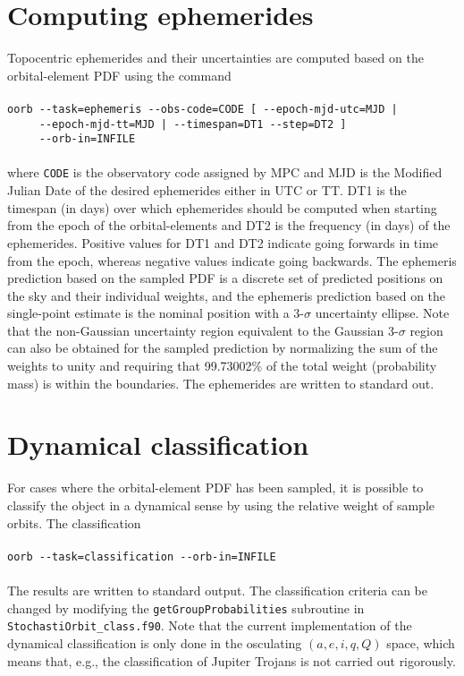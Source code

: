 \documentclass[12pt,english,twoside,a4paper]{report}
\begin{document}
\section{Computing ephemerides}

Topocentric ephemerides and their uncertainties are computed based on
the orbital-element PDF using the command \\ \\
\verb+oorb --task=ephemeris --obs-code=CODE [ --epoch-mjd-utc=MJD |+\\
\verb+     --epoch-mjd-tt=MJD | --timespan=DT1 --step=DT2 ]+\\
\verb+     --orb-in=INFILE+\\ \\
where \verb|CODE| is the observatory code assigned by MPC and MJD is
the Modified Julian Date of the desired ephemerides either in UTC or
TT. DT1 is the timespan (in days) over which ephemerides should be
computed when starting from the epoch of the orbital-elements and DT2
is the frequency (in days) of the ephemerides. Positive values for DT1
and DT2 indicate going forwards in time from the epoch, whereas
negative values indicate going backwards. The ephemeris prediction
based on the sampled PDF is a discrete set of predicted positions
on the sky and their individual weights, and the ephemeris prediction
based on the single-point estimate is the nominal position with a
3-$\sigma$ uncertainty ellipse. Note that the non-Gaussian uncertainty
region equivalent to the Gaussian 3-$\sigma$ region can also be
obtained for the sampled prediction by normalizing the sum of the
weights to unity and requiring that 99.73002\% of the total weight
(probability mass) is within the boundaries. The ephemerides are
written to standard out.

\section{Dynamical classification}

For cases where the orbital-element PDF has been sampled, it is
possible to classify the object in a dynamical sense by using the
relative weight of sample orbits. The classification
\\ \\ \verb|oorb --task=classification --orb-in=INFILE| \\ \\ The
results are written to standard output.  The classification criteria
can be changed by modifying the \verb|getGroupProbabilities|
subroutine in \\ \verb|StochastiOrbit_class.f90|. Note that the
current implementation of the dynamical classification is only done in
the osculating $(a,e,i,q,Q)$ space, which means that, e.g., the
classification of Jupiter Trojans is not carried out rigorously.
\end{document}
